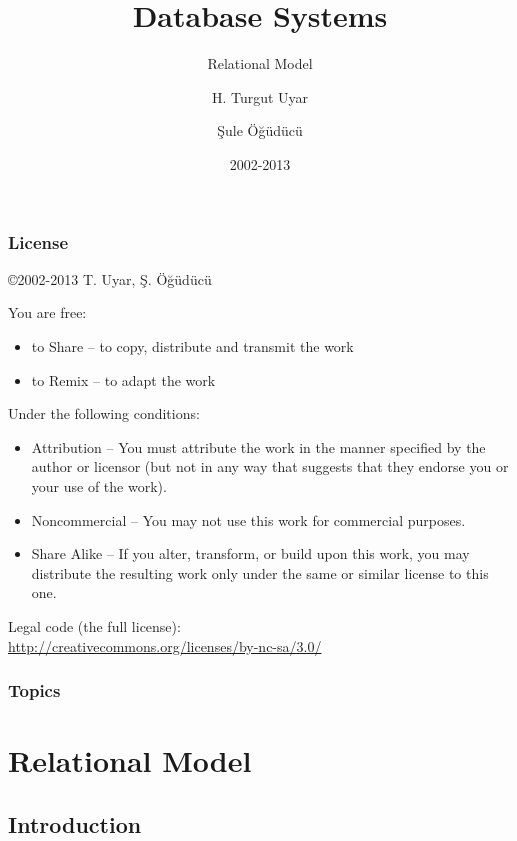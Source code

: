 \documentclass[dvipsnames]{beamer}
\title{Database Systems}
\subtitle{Relational Model}
\author{H. Turgut Uyar \and Şule Öğüdücü}
\date{2002-2013}
\theoremstyle{plain}
\begin{document}
\begin{frame}
  \titlepage
\end{frame}

\begin{frame}
  \frametitle{License}

  \hfill
  \copyright 2002-2013 T. Uyar, Ş. Öğüdücü

  \vfill
  \begin{tiny}
    You are free:
    \begin{itemize}
      \item to Share -- to copy, distribute and transmit the work
      \item to Remix -- to adapt the work
    \end{itemize}

    Under the following conditions:
    \begin{itemize}
      \item Attribution -- You must attribute the work in the manner specified by
        the author or licensor (but not in any way that suggests that they
        endorse you or your use of the work).

      \item Noncommercial -- You may not use this work for commercial purposes.

      \item Share Alike -- If you alter, transform, or build upon this work, you
        may distribute the resulting work only under the same or similar license
        to this one.
    \end{itemize}
  \end{tiny}

  \vfill
  Legal code (the full license):\\
  \url{http://creativecommons.org/licenses/by-nc-sa/3.0/}
\end{frame}

\begin{frame}
  \frametitle{Topics}
  \tableofcontents
\end{frame}

\lstset{language=TutorialD}

\section{Relational Model}

\subsection{Introduction}
\end{document}

